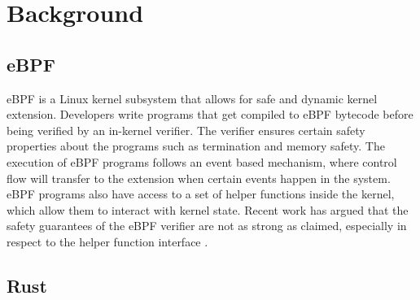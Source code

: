 \section{Background}

\subsection{eBPF}
eBPF is a Linux kernel subsystem that allows for safe and dynamic kernel extension.
Developers write programs that get compiled to eBPF bytecode before being verified by an in-kernel verifier.
The verifier ensures certain safety properties about the programs such as termination and memory safety.
The execution of eBPF programs follows an event based mechanism, where control flow will transfer to the extension when certain events happen in the system.
eBPF programs also have access to a set of helper functions inside the kernel, which allow them to interact with kernel state.
Recent work has argued that the safety guarantees of the eBPF verifier are not as strong as claimed, especially in respect to the helper function interface \cite{untenableVerification}.


\subsection{Rust}

